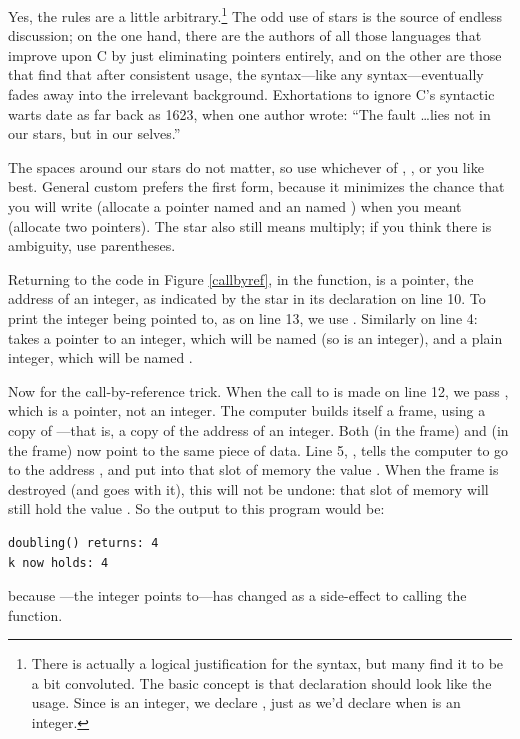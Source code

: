 \documentclass[12pt]{article}
\begin{document}
Yes, the rules are a little arbitrary.\footnote{There is actually a
logical justification for the syntax, but many find it to be a bit
convoluted. The basic concept is that declaration should look like
the usage. Since  is an integer, we declare ,
just as we'd declare  when  is an integer.} The
odd use of stars is the source of endless discussion; on the one hand,
there are the authors of all those languages that improve upon C by
just eliminating pointers entirely, and on the other are those that find
that after consistent usage, the syntax---like any syntax---eventually
fades away into the irrelevant background.  Exhortations to ignore
C's syntactic warts date as far back as 1623, when one author wrote:
``The fault \dots lies not in our stars, but in our
selves.''

The spaces around our stars do not matter, so use whichever of , , or  you like best. General
custom prefers the first form, because it minimizes the chance that you
will write  (allocate a pointer named 
and an  named ) when you meant  (allocate two pointers). The star also
still means multiply; if you think there is ambiguity, use parentheses.

Returning to the code in Figure \ref{callbyref}, in the 
function,  is a pointer, the address of an integer, as
indicated by the star in its declaration on line 10. To print the integer
being pointed to, as on line 13, we use .
Similarly on line 4:  takes a pointer to an integer,
which will be named  (so  is an integer),
and a plain integer, which will be named
.

Now for the call-by-reference trick.  When the call to 
is made on line 12, we pass , which is a pointer, not
an integer. The computer builds itself a frame, using a copy of
---that is, a copy of the address of an integer. Both
 (in the  frame) and  (in the
 frame) now point to the same piece of data.  Line 5,
, tells the computer to go to the address
, and put into that slot of memory the value . When the frame is destroyed (and  goes with it),
this will not be undone: that slot of memory will still hold the value
.  So the output to this program would be: 
\begin{lstlisting}
doubling() returns: 4
k now holds: 4
\end{lstlisting}
because ---the integer  points to---has changed as a
side-effect to calling the  function.
\end{document}
